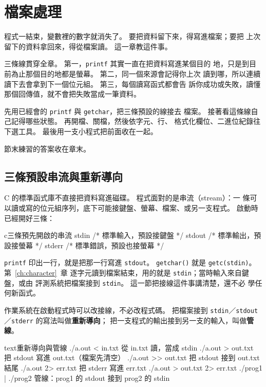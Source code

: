 \chapter{檔案處理}
\label{ch:fileio}

程式一結束，變數裡的數字就消失了。 要把資料留下來，得寫進檔案；要把
上次留下的資料拿回來，得從檔案讀。 這一章教這件事。

三條線貫穿全章。 第一，\texttt{printf} 其實一直在把資料寫進某個目的
地，只是到目前為止那個目的地都是螢幕。 第二，同一個來源會記得你上次
讀到哪，所以連續讀下去會拿到下一個位元組。 第三，每個讀寫函式都會告
訴你成功或失敗，讀懂那個回傳值，就不會把失敗當成一筆資料。

先用已經會的 \texttt{printf} 與 \texttt{getchar}，把三條預設的線接去
檔案。 接著看這條線自己記得哪些狀態。 再開檔、關檔，然後依字元、行、
格式化欄位、二進位紀錄往下選工具。 最後用一支小程式把前面收在一起。

節末練習的答案收在章末。

\section{三條預設串流與重新導向}
\label{sec:fio-stream}

C 的標準函式庫不直接把資料寫進磁碟。 程式面對的是串流（stream）：一
條可以讀或寫的位元組序列，底下可能接鍵盤、螢幕、檔案、或另一支程式。
啟動時已經開好三條：

\begin{code}{c}{三條預先開啟的串流}
stdin    /* 標準輸入，預設接鍵盤 */
stdout   /* 標準輸出，預設接螢幕 */
stderr   /* 標準錯誤，預設也接螢幕 */
\end{code}

\texttt{printf} 印出一行，就是把那一行寫進 \texttt{stdout}。
\texttt{getchar()} 就是 \texttt{getc(stdin)}。 第~\ref{ch:character}~章
逐字元讀到檔案結束，用的就是 \texttt{stdin}；當時輸入來自鍵盤，或由
評測系統把檔案接到 \texttt{stdin}。 這一節把接線這件事講清楚，還不必
學任何新函式。

作業系統在啟動程式時可以改接線，不必改程式碼。 把檔案接到
\texttt{stdin}／\texttt{stdout}／\texttt{stderr} 的寫法叫做\textbf{重新導向}；
把一支程式的輸出接到另一支的輸入，叫做\textbf{管線}。

\begin{code}{text}{重新導向與管線}
./a.out < in.txt          從 in.txt 讀，當成 stdin
./a.out > out.txt         把 stdout 寫進 out.txt（檔案先清空）
./a.out >> out.txt        把 stdout 接到 out.txt 結尾
./a.out 2> err.txt        把 stderr 寫進 err.txt
./a.out > out.txt 2> err.txt
./prog1 | ./prog2         管線：prog1 的 stdout 接到 prog2 的 stdin
\end{code}

